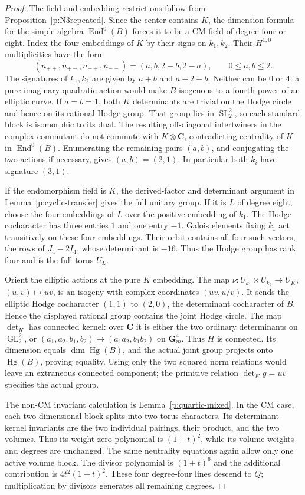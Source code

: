 \documentclass[10pt,reqno]{article}
\theoremstyle{emphasizedplain}
\theoremstyle{emphasizeddefinition}
\theoremstyle{emphasizeddefinition}
\DeclareMathOperator{\End}{End}
\DeclareMathOperator{\Hg}{Hg}
\DeclareMathOperator{\GL}{GL}
\DeclareMathOperator{\SL}{SL}
\newcommand{\C}{\mathbf C}
\begin{document}
\begin{proof}
The field and embedding restrictions follow from
Proposition~\ref{p:N3repeated}. Since the center contains $K$,
the dimension formula for the simple algebra $\End^0(B)$ forces
it to be a CM field of degree four or eight.
Index the four embeddings of $K$ by their signs on $k_1,k_2$.
Their $H^{1,0}$ multiplicities have the form
\[
 (n_{++},n_{+-},n_{-+},n_{--})=(a,b,2-b,2-a),
 \qquad 0\leq a,b\leq2.
\]
The signatures of $k_1,k_2$ are given by $a+b$ and $a+2-b$.
Neither can be $0$ or $4$: a pure imaginary-quadratic action
would make $B$ isogenous to a fourth power of an elliptic curve.
If $a=b=1$, both $K$ determinants are trivial on the Hodge circle
and hence on its rational Hodge group. That group lies in
$\SL_2^2$, so each standard block is isomorphic to its dual.
The resulting off-diagonal intertwiners in the complex commutant
do not commute with $K\otimes\C$, contradicting centrality of
$K$ in $\End^0(B)$. Enumerating the remaining pairs $(a,b)$,
and conjugating the two actions if necessary, gives
$(a,b)=(2,1)$. In particular both $k_i$ have signature $(3,1)$.

If the endomorphism field is $K$, the derived-factor and determinant
argument in Lemma~\ref{p:cyclic-transfer} gives the full unitary
group. If it is $L$ of degree eight, choose the four embeddings
of $L$ over the positive embedding of $k_1$. The Hodge cocharacter
has three entries $1$ and one entry $-1$. Galois elements fixing
$k_1$ act transitively on these four embeddings. Their orbit
contains all four such vectors, the rows of $J_4-2I_4$, whose
determinant is $-16$. Thus the Hodge group has rank four and is
the full torus $U_L$.

Orient the elliptic actions at the pure $K$ embedding. The map
$\nu:U_{k_1}\times U_{k_2}\to U_K$, $(u,v)\mapsto uv$,
is an isogeny with complex coordinates $(uv,u/v)$. It sends the
elliptic Hodge cocharacter $(1,1)$ to $(2,0)$, the determinant
cocharacter of $B$. Hence the displayed rational group contains
the joint Hodge circle. The map $\det_K$ has connected kernel:
over $\C$ it is either the two ordinary determinants on
$\GL_2^2$, or $(a_1,a_2,b_1,b_2)\mapsto(a_1a_2,b_1b_2)$
on $\mathbf G_m^4$. Thus $H$ is connected. Its dimension equals
$\dim\Hg(B)$, and the actual joint group projects onto
$\Hg(B)$, proving equality. Using only the two squared norm
relations would leave an extraneous connected component; the
primitive relation $\det_K g=uv$ specifies the actual group.

The non-CM invariant calculation is Lemma~\ref{p:quartic-mixed}.
In the CM case, each two-dimensional block splits into two torus
characters. Its determinant-kernel invariants are the two
individual pairings, their product, and the two volumes. Thus its
weight-zero polynomial is $(1+t)^2$, while its volume weights
and degrees are unchanged. The same neutrality equations again
allow only one active volume block. The divisor polynomial is
$(1+t)^6$ and the additional contribution is
$4t^2(1+t)^2$. These four degree-four lines descend to $Q$;
multiplication by divisors generates all remaining degrees.
\end{proof}
\end{document}

